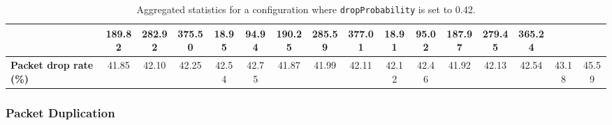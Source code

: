 \begin{table}[!h]
{\begin{tabular}{|l|ccccc|ccccc|ccccc|}
            & \multicolumn{1}{c|}{189.82}
            & \multicolumn{1}{c|}{282.92}
            & \multicolumn{1}{c|}{375.50}
            & \multicolumn{1}{c|}{18.95}
            & \multicolumn{1}{c|}{94.94}
            & \multicolumn{1}{c|}{190.25}
            & \multicolumn{1}{c|}{285.59}
            & \multicolumn{1}{c|}{377.01}
            & \multicolumn{1}{c|}{18.91}
            & \multicolumn{1}{c|}{95.02}
            & \multicolumn{1}{c|}{187.97}
            & \multicolumn{1}{c|}{279.45}
            & \multicolumn{1}{c|}{365.24}
            \\ \hline
            \textbf{Packet drop rate (\%)} & \multicolumn{1}{c|}{41.85} & \multicolumn{1}{c|}{42.10}
            & \multicolumn{1}{c|}{42.25}
            & \multicolumn{1}{c|}{42.54}
            & \multicolumn{1}{c|}{42.75}
            & \multicolumn{1}{c|}{41.87}
            & \multicolumn{1}{c|}{41.99}
            & \multicolumn{1}{c|}{42.11}
            & \multicolumn{1}{c|}{42.12}
            & \multicolumn{1}{c|}{42.46}
            & \multicolumn{1}{c|}{41.92}
            & \multicolumn{1}{c|}{42.13}
            & \multicolumn{1}{c|}{42.54}
            & \multicolumn{1}{c|}{43.18}
            & \multicolumn{1}{c|}{45.59}
            \\ \hline
        \end{tabular}
    }
    \caption{Aggregated statistics for a configuration where \texttt{dropProbability} is set to 0.42.}
    \label{table:analysis_results_drop}
\end{table}

\subsubsection{Packet Duplication}\label{subsubsection:duplication_analysis}

